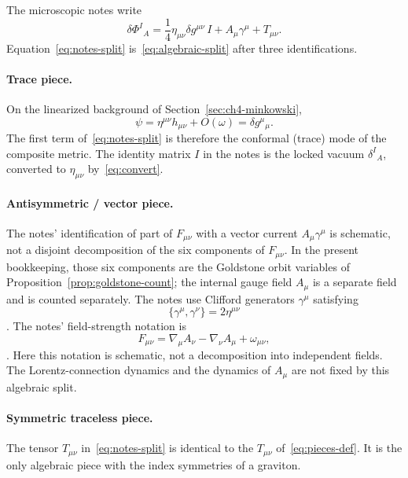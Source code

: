The microscopic notes write
\begin{equation}
  \label{eq:notes-split}
  \delta\Phi^I{}_A
  =\frac14\eta_{\mu\nu}\delta g^{\mu\nu}\,I
   +A_\mu\gamma^\mu
   +T_{\mu\nu}.
\end{equation}
Equation~\eqref{eq:notes-split} is~\eqref{eq:algebraic-split} after
three identifications.

\paragraph{Trace piece.}
On the linearized background of Section~\ref{sec:ch4-minkowski},
\begin{equation}
  \label{eq:psi-h}
  \psi=\eta^{\mu\nu}h_{\mu\nu}+O(\omega)
  =\delta g^{\mu}{}_{\mu}.
\end{equation}
The first term of~\eqref{eq:notes-split} is therefore the conformal
(trace) mode of the composite metric. The identity matrix \(I\) in
the notes is the locked vacuum \(\delta^I{}_A\), converted to
\(\eta_{\mu\nu}\) by~\eqref{eq:convert}.

\paragraph{Antisymmetric / vector piece.}
The notes' identification of part of \(F_{\mu\nu}\) with a vector
current \(A_\mu\gamma^\mu\) is schematic, not a disjoint decomposition
of the six components of \(F_{\mu\nu}\). In the present bookkeeping,
those six components are the Goldstone orbit variables of
Proposition~\ref{prop:goldstone-count}; the internal gauge field
\(A_\mu\) is a separate field and is counted separately. The notes
use Clifford generators \(\gamma^\mu\) satisfying
\begin{equation}
  \label{eq:clifford}
  \{\gamma^\mu,\gamma^\nu\}=2\eta^{\mu\nu}
\end{equation}.
The notes' field-strength notation is
\begin{equation}
  \label{eq:F-split}
  F_{\mu\nu}
  =\nabla_\mu A_\nu-\nabla_\nu A_\mu
   +\omega_{\mu\nu},
\end{equation}.
Here this notation is schematic, not a decomposition into
independent fields. The Lorentz-connection dynamics and the dynamics
of \(A_\mu\) are not fixed by this algebraic split.

\paragraph{Symmetric traceless piece.}
The tensor \(T_{\mu\nu}\) in~\eqref{eq:notes-split} is identical to
the \(T_{\mu\nu}\) of~\eqref{eq:pieces-def}. It is the only algebraic
piece with the index symmetries of a graviton.

